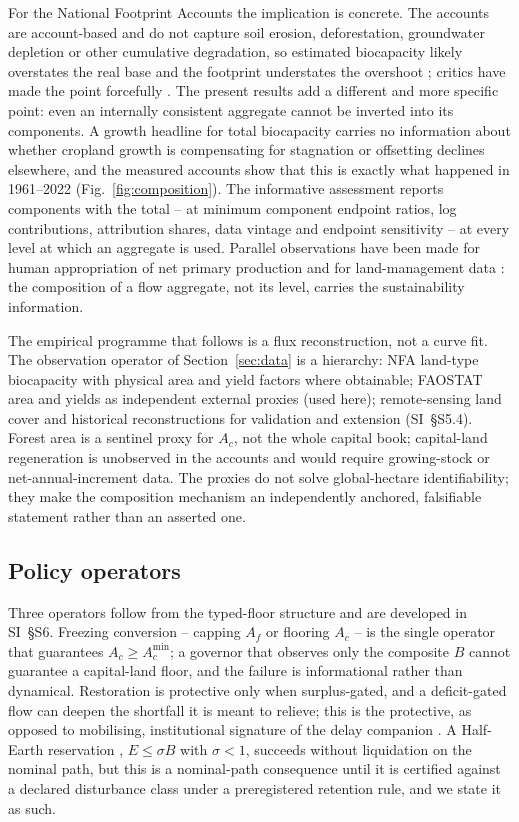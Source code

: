 \documentclass[preprint,12pt,authoryear]{elsarticle}
\newcommand{\Acmin}{A_c^{\min}}
\begin{document}
For the National Footprint Accounts the implication is concrete. The accounts are account-based and do not capture soil erosion, deforestation, groundwater depletion or other cumulative degradation, so estimated biocapacity likely overstates the real base and the footprint understates the overshoot \citep{Wackernagel2002,Borucke2013}; critics have made the point forcefully \citep{Blomqvist2013,GiampietroSaltelli2014,Galli2016,vdBerghGrazi2015}. The present results add a different and more specific point: even an internally consistent aggregate cannot be inverted into its components. A growth headline for total biocapacity carries no information about whether cropland growth is compensating for stagnation or offsetting declines elsewhere, and the measured accounts show that this is exactly what happened in 1961--2022 (Fig.~\ref{fig:composition}). The informative assessment reports components with the total -- at minimum component endpoint ratios, log contributions, attribution shares, data vintage and endpoint sensitivity -- at every level at which an aggregate is used. Parallel observations have been made for human appropriation of net primary production and for land-management data \citep{Haberl2007,Krausmann2013,Erb2017,Carvalhais2014}: the composition of a flow aggregate, not its level, carries the sustainability information.

The empirical programme that follows is a flux reconstruction, not a curve fit. The observation operator of Section~\ref{sec:data} is a hierarchy: NFA land-type biocapacity with physical area and yield factors where obtainable; FAOSTAT area and yields as independent external proxies (used here); remote-sensing land cover and historical reconstructions for validation and extension (SI~\S S5.4). Forest area is a sentinel proxy for $A_c$, not the whole capital book; capital-land regeneration is unobserved in the accounts and would require growing-stock or net-annual-increment data. The proxies do not solve global-hectare identifiability; they make the composition mechanism an independently anchored, falsifiable statement rather than an asserted one.

\subsection{Policy operators}

Three operators follow from the typed-floor structure and are developed in SI~\S S6. Freezing conversion -- capping $A_f$ or flooring $A_c$ -- is the single operator that guarantees $A_c\ge\Acmin$; a governor that observes only the composite $B$ cannot guarantee a capital-land floor, and the failure is informational rather than dynamical. Restoration is protective only when surplus-gated, and a deficit-gated flow can deepen the shortfall it is meant to relieve; this is the protective, as opposed to mobilising, institutional signature of the delay companion \citep{Abaee2026a}. A Half-Earth reservation \citep{Wilson2016}, $E\le\sigma B$ with $\sigma<1$, succeeds without liquidation on the nominal path, but this is a nominal-path consequence until it is certified against a declared disturbance class under a preregistered retention rule, and we state it as such.
\end{document}

